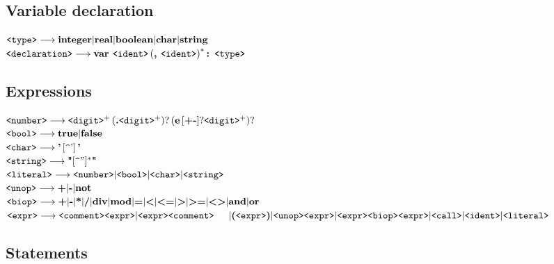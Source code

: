 \documentclass[a4paper,12pt,notitlepage,english]{article}
\begin{document}
  \subsection{Variable declaration}

  \(\verb+<type>+ \longrightarrow \text{\bfseries integer} | \text{\bfseries real} | \text{\bfseries boolean} | \text{\bfseries char} | \text{\bfseries string} \)\\
  \(\verb+<declaration>+ \longrightarrow \text{\bfseries var } \verb+<ident>+\left(\text{\bfseries , } \verb+<ident>+\right)^*\text{\bfseries : } \verb+<type>+\)

  \subsection{Expressions}

  \(\verb+<number>+ \longrightarrow \verb+<digit>+^+\left(\text{\bfseries .}\verb+<digit>+^+\right)?\left(\text{\bfseries e}\left[\text{\bfseries +-}\right]?\verb+<digit>+^+\right)?\)\\
  \(\verb+<bool>+ \longrightarrow \text{\bfseries true} | \text{\bfseries false}\)\\
  \(\verb+<char>+ \longrightarrow \text{\bfseries '}\left[\verb+^+\text{'}\right]\text{\bfseries '}\)\\
  \(\verb+<string>+ \longrightarrow \text{\bfseries "}[\verb+^+"]^*\text{\bfseries "}\)\\
  \(\verb+<literal>+ \longrightarrow \verb+<number>+ | \verb+<bool>+ | \verb+<char>+ | \verb+<string>+\)\\
  \(\verb+<unop>+ \longrightarrow \text{\bfseries +} | \text{\bfseries -} | \text{\bfseries not}\)\\
  \(\verb+<biop>+ \longrightarrow \text{\bfseries +} | \text{\bfseries -} | \text{\bfseries *} | \text{\bfseries /} | \text{\bfseries div} | \text{\bfseries mod} | \text{\bfseries =} | \text{\bfseries <} | \text{\bfseries <=} | \text{\bfseries >} | \text{\bfseries >=} | \text{\bfseries <>} | \text{\bfseries and} | \text{\bfseries or}\)\\
  \(\verb+<expr>+ \longrightarrow \verb+<comment>+\verb+<expr>+ | \verb+<expr>+\verb+<comment>+\\\indent | \text{\bfseries (}\verb+<expr>+\text{\bfseries )} | \verb+<unop>+\verb+<expr>+ | \verb+<expr>+\verb+<biop>+\verb+<expr>+ | \verb+<call>+ | \verb+<ident>+ | \verb+<literal>+\)

  \subsection{Statements}
\end{document}
